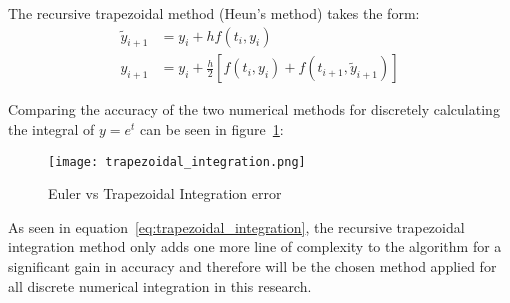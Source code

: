The recursive trapezoidal method (Heun's method) takes the form:
\begin{equation}\label{eq:trapezoidal_integration}
\begin{split}
\tilde{y}_{i+1}&=y_i+hf(t_i,y_i) \\
y_{i+1}&=y_i+\frac{h}{2}[f(t_i,y_i)+f(t_{i+1},\tilde{y}_{i+1})]
\end{split}
\end{equation}

Comparing the accuracy of the two numerical methods for discretely calculating the integral of $y=e^t$ can be seen in figure~\ref{fig:trapezoidal_integration}:

\begin{figure}[h!]
 \centering
  \texttt{[image: trapezoidal\_integration.png]}
  \caption{Euler vs Trapezoidal Integration error}
  \label{fig:trapezoidal_integration}
\end{figure}

As seen in equation~\ref{eq:trapezoidal_integration}, the recursive trapezoidal integration method only adds one more line of complexity to the algorithm for a significant gain in accuracy and therefore will be the chosen method applied for all discrete numerical integration in this research.













